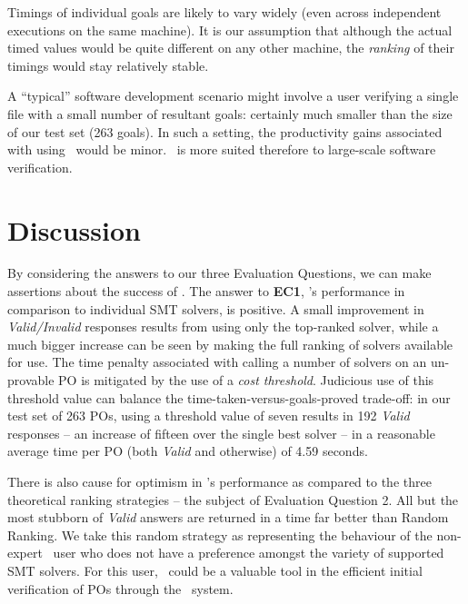 Timings of individual goals are likely to vary widely (even across independent executions on the same machine).
It is our assumption that although the actual timed values would be quite different on any other machine, the \textit{ranking} of their timings would stay relatively stable.

A ``typical'' software development scenario might involve a user verifying a single file with a small number of resultant goals: certainly much smaller than the size of our test set (263 goals). In such a setting, the productivity gains associated with using \where~would be minor. 
\where~is more suited therefore to large-scale software verification.


\section{Discussion}
\label{sec:eval-discuss}

By considering the answers to our three Evaluation Questions, we can make assertions about the success of  \where.
The answer to \textbf{EC1}, \where's performance in comparison to individual SMT solvers, is positive.
A small improvement in \textit{Valid/Invalid} responses results from using only the top-ranked solver, while a much bigger increase can be seen by making the full ranking of solvers available for use.
The time penalty associated with calling a number of solvers on an un-provable PO is mitigated by the use of a \textit{cost threshold}.
Judicious use of this threshold value can balance the time-taken-versus-goals-proved trade-off: in our test set of 263 POs, using a threshold value of seven results in 192 \textit{Valid} responses -- an increase of fifteen over the single best solver -- in a reasonable average time per PO (both \textit{Valid} and otherwise) of 4.59 seconds.

There is also cause for optimism in \where's performance as compared to the three theoretical ranking strategies -- the subject of Evaluation Question 2. 
All but the most stubborn of \textit{Valid} answers are returned in a time far better than \textsf{Random Ranking}.
We take this random strategy as representing the behaviour of the non-expert \why~user who does not have a preference amongst the variety of supported SMT solvers.
For this user, \where~could be a valuable tool in the efficient initial verification of POs through the \why~system.    


